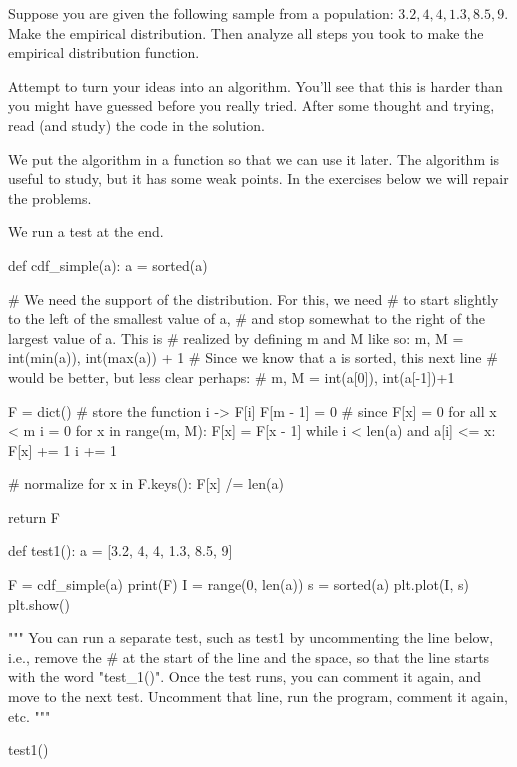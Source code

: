 \begin{exercise}
  Suppose you are given the following sample from a population: $3.2, 4, 4, 1.3, 8.5, 9$.
  Make the empirical distribution.
  Then analyze all steps you took to make the empirical distribution function.

  Attempt to turn your ideas into an algorithm.
  You'll see that this is harder than you might have guessed before you really tried.
  After some thought and trying, read (and study) the code in the solution.

\begin{solution}
We put the algorithm in a function so that we can use it later.  The algorithm is useful to study,  but it has some weak points. In the exercises below we will repair the problems.

We run a test at the end.

\begin{pyverbatim}
def cdf_simple(a):
    a = sorted(a)

    # We need the support of the distribution. For this, we need
    # to start slightly to the left of the smallest value of a,
    # and stop somewhat to the right of the largest value of a. This is
    # realized by defining m and M like so:
    m, M = int(min(a)), int(max(a)) + 1
    # Since we know that a is sorted, this next line
    # would be better, but less clear perhaps:
    # m, M = int(a[0]), int(a[-1])+1

    F = dict()  # store the function i -> F[i]
    F[m - 1] = 0  # since F[x] = 0 for all x < m
    i = 0
    for x in range(m, M):
        F[x] = F[x - 1]
        while i < len(a) and a[i] <= x:
            F[x] += 1
            i += 1

    # normalize
    for x in F.keys():
        F[x] /= len(a)

    return F


def test1():
    a = [3.2, 4, 4, 1.3, 8.5, 9]

    F = cdf_simple(a)
    print(F)
    I = range(0, len(a))
    s = sorted(a)
    plt.plot(I, s)
    plt.show()


"""
You can run a separate test, such as test1 by uncommenting the line
below, i.e., remove the # at the start of the line and the space, so
that the line starts with the word "test_1()". Once the test runs, you
can comment it again, and move to the next test. Uncomment that line,
run the program, comment it again, etc.
"""

test1()
\end{pyverbatim}

\end{solution}
\end{exercise}

